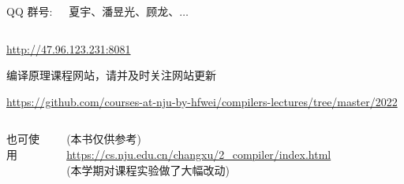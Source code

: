 \begin{frame}{}
  \begin{columns}
    \begin{center}
      QQ 群号: 

    \end{center}
    \begin{center}
      {\bf {}} 夏宇、潘昱光、顾龙、$\dots$
    \end{center}
  \end{columns}
\end{frame}

\begin{frame}{}
  \begin{center}
    \url{http://47.96.123.231:8081} \\[5pt]


    编译原理课程网站，请并及时关注网站更新
  \end{center}
\end{frame}

\begin{frame}{}
  \begin{center}

    \vspace{0.50cm}
    \url{https://github.com/courses-at-nju-by-hfwei/compilers-lectures/tree/master/2022}
  \end{center}
\end{frame}

\begin{frame}{}
  \begin{columns}
    \begin{center}
      也可使用
    \end{center}
    \begin{center}
      (本书仅供参考)
      \url{https://cs.nju.edu.cn/changxu/2_compiler/index.html} \\[3pt]
      (本学期对课程实验做了大幅改动)
    \end{center}
  \end{columns}
\end{frame}

